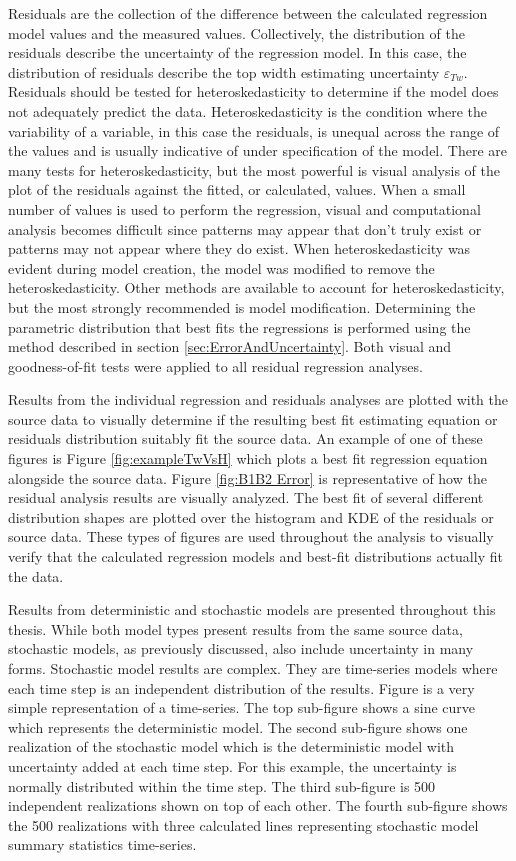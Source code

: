 \begin{linenumbers}
Residuals are the collection of the difference between the calculated regression model values and the measured values.  Collectively, the distribution of the residuals describe the uncertainty of the regression model.  In this case, the distribution of residuals describe the top width estimating uncertainty $ \varepsilon_{Tw} $.  Residuals should be tested for heteroskedasticity to determine if the model does not adequately predict the data.  Heteroskedasticity is the condition where the variability of a variable, in this case the residuals, is unequal across the range of the values and is usually indicative of under specification of the model.  There are many tests for heteroskedasticity, but the most powerful is visual analysis of the plot of the residuals against the fitted, or calculated, values.  When a small number of values is used to perform the regression, visual and computational analysis becomes difficult since patterns may appear that don't truly exist or patterns may not appear where they do exist.  When heteroskedasticity was evident during model creation, the model was modified to remove the heteroskedasticity.  Other methods are available to account for heteroskedasticity, but the most strongly recommended is model modification.  Determining the parametric distribution that best fits the regressions is performed using the method described in section \ref{sec:ErrorAndUncertainty}.  Both visual and goodness-of-fit tests were applied to all residual regression analyses.

Results from the individual regression and residuals analyses are plotted with the source data to visually determine if the resulting best fit estimating equation or residuals distribution suitably fit the source data.  An example of one of these figures is Figure \ref{fig:exampleTwVsH} which plots a best fit regression equation alongside the source data.  Figure \ref{fig:B1B2 Error} is representative of how the residual analysis results are visually analyzed.  The best fit of several different distribution shapes are plotted over the histogram and KDE of the residuals or source data.  These types of figures are used throughout the analysis to visually verify that the calculated regression models and best-fit distributions actually fit the data.

Results from deterministic and stochastic models are presented throughout this thesis.  While both model types present results from the same source data, stochastic models, as previously discussed, also include uncertainty in many forms.  Stochastic model results are complex.  They are time-series models where each time step is an independent distribution of the results.  Figure is a very simple representation of a time-series.  The top sub-figure shows a sine curve which represents the deterministic model.  The second sub-figure shows one realization of the stochastic model which is the deterministic model with uncertainty added at each time step.  For this example, the uncertainty is normally distributed within the time step.  The third sub-figure is 500 independent realizations shown on top of each other.  The fourth sub-figure shows the 500 realizations with three calculated lines representing stochastic model summary statistics time-series.


\end{linenumbers}
